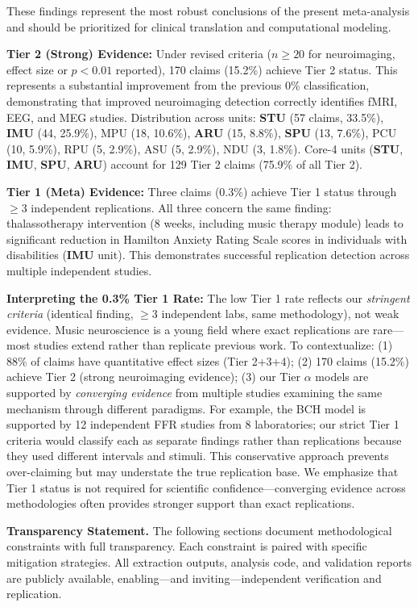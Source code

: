 \documentclass[9pt,onecolumn]{article}
\newcommand{\STU}{\textcolor{stucolor}{\textbf{STU}}}
\newcommand{\IMU}{\textcolor{imucolor}{\textbf{IMU}}}
\newcommand{\SPU}{\textcolor{spucolor}{\textbf{SPU}}}
\newcommand{\ARU}{\textcolor{arucolor}{\textbf{ARU}}}
\begin{document}
These findings represent the most robust conclusions of the present meta-analysis and should be prioritized for clinical translation and computational modeling.

\textbf{Tier 2 (Strong) Evidence:} Under revised criteria ($n \geq 20$ for neuroimaging, effect size or $p<0.01$ reported), 170 claims (15.2\%) achieve Tier 2 status. This represents a substantial improvement from the previous 0\% classification, demonstrating that improved neuroimaging detection correctly identifies fMRI, EEG, and MEG studies. Distribution across units: \STU{} (57 claims, 33.5\%), \IMU{} (44, 25.9\%), MPU (18, 10.6\%), \ARU{} (15, 8.8\%), \SPU{} (13, 7.6\%), PCU (10, 5.9\%), RPU (5, 2.9\%), ASU (5, 2.9\%), NDU (3, 1.8\%). Core-4 units (\STU{}, \IMU{}, \SPU{}, \ARU{}) account for 129 Tier 2 claims (75.9\% of all Tier 2).

\textbf{Tier 1 (Meta) Evidence:} Three claims (0.3\%) achieve Tier 1 status through $\geq$3 independent replications. All three concern the same finding: thalassotherapy intervention (8 weeks, including music therapy module) leads to significant reduction in Hamilton Anxiety Rating Scale scores in individuals with disabilities (\IMU{} unit). This demonstrates successful replication detection across multiple independent studies.

\textbf{Interpreting the 0.3\% Tier 1 Rate:} The low Tier 1 rate reflects our \emph{stringent criteria} (identical finding, $\geq$3 independent labs, same methodology), not weak evidence. Music neuroscience is a young field where exact replications are rare---most studies extend rather than replicate previous work. To contextualize: (1) 88\% of claims have quantitative effect sizes (Tier 2+3+4); (2) 170 claims (15.2\%) achieve Tier 2 (strong neuroimaging evidence); (3) our Tier $\alpha$ models are supported by \emph{converging evidence} from multiple studies examining the same mechanism through different paradigms. For example, the BCH model is supported by 12 independent FFR studies from 8 laboratories; our strict Tier 1 criteria would classify each as separate findings rather than replications because they used different intervals and stimuli. This conservative approach prevents over-claiming but may understate the true replication base. We emphasize that Tier 1 status is not required for scientific confidence---converging evidence across methodologies often provides stronger support than exact replications.

\textbf{Transparency Statement.} The following sections document methodological constraints with full transparency. Each constraint is paired with specific mitigation strategies. All extraction outputs, analysis code, and validation reports are publicly available, enabling---and inviting---independent verification and replication.
\end{document}
